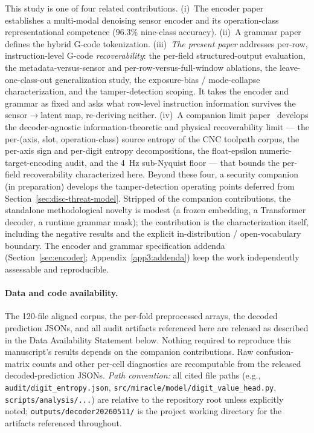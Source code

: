 \documentclass[sensors,article,submit,moreauthors,pdftex]{Definitions/mdpi}
\begin{document}
This study is one of four related contributions. (i)~The encoder paper~\cite{encoder_paper} establishes a multi-modal denoising sensor encoder and its operation-class representational competence ($96.3\%$ nine-class accuracy). (ii)~A grammar paper~\cite{grammar_paper} defines the hybrid G-code tokenization. (iii)~\emph{The present paper} addresses per-row, instruction-level G-code \emph{recoverability}: the per-field structured-output evaluation, the metadata-versus-sensor and per-row-versus-full-window ablations, the leave-one-class-out generalization study, the exposure-bias / mode-collapse characterization, and the tamper-detection scoping. It takes the encoder and grammar as fixed and asks what row-level instruction information survives the sensor$\rightarrow$latent map, re-deriving neither. (iv)~A companion limit paper~\cite{paperB_entropy} develops the decoder-agnostic information-theoretic and physical recoverability limit --- the per-(axis, slot, operation-class) source entropy of the CNC toolpath corpus, the per-axis sign and per-digit entropy decompositions, the float-epsilon numeric-target-encoding audit, and the 4~Hz sub-Nyquist floor --- that bounds the per-field recoverability characterized here. Beyond these four, a security companion (in preparation) develops the tamper-detection operating points deferred from Section~\ref{sec:disc-threat-model}. Stripped of the companion contributions, the standalone methodological novelty is modest (a frozen embedding, a Transformer decoder, a runtime grammar mask); the contribution is the characterization itself, including the negative results and the explicit in-distribution / open-vocabulary boundary. The encoder and grammar specification addenda (Section~\ref{sec:encoder}; Appendix~\ref{app3:addenda}) keep the work independently assessable and reproducible.

\paragraph{Data and code availability.} The 120-file aligned corpus, the per-fold preprocessed arrays, the decoded prediction JSONs, and all audit artifacts referenced here are released as described in the Data Availability Statement below. Nothing required to reproduce this manuscript's results depends on the companion contributions. Raw confusion-matrix counts and other per-cell diagnostics are recomputable from the released decoded-prediction JSONs. \emph{Path convention:} all cited file paths (e.g., \texttt{audit/digit\_entropy.json}, \texttt{src/miracle/model/digit\_value\_head.py}, \texttt{scripts/analysis/...}) are relative to the repository root unless explicitly noted; \texttt{outputs/decoder20260511/} is the project working directory for the artifacts referenced throughout.
\end{document}
